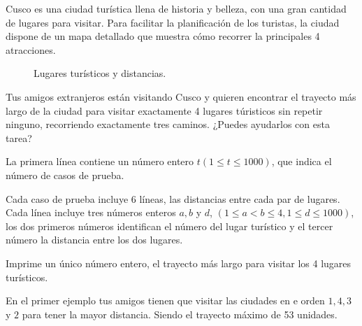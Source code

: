 
Cusco es una ciudad turística llena de historia y belleza, con una gran cantidad de lugares para visitar. Para facilitar la planificación de los turistas, la ciudad dispone de un mapa detallado que muestra cómo recorrer la principales 4 atracciones.

\begin{figure}[h]
    \centering
    
    \captionsetup{labelformat=empty}
    \caption{Lugares turísticos y distancias.}
\end{figure}

Tus amigos extranjeros están visitando Cusco y quieren encontrar el trayecto más largo de la ciudad para visitar exactamente 4 lugares túristicos sin repetir ninguno, recorriendo exactamente tres caminos. ¿Puedes ayudarlos con esta tarea?


La primera línea contiene un número entero $t (1 \leq t \leq 1000)$,  que indica el número de casos de prueba.

Cada caso de prueba incluye 6 líneas, las distancias entre cada par de lugares. Cada línea incluye tres números enteros $a, b$ y $d$, $(1 \leq a < b \leq 4, 1 \leq d \leq 1000)$, los dos primeros números identifican el número del lugar turístico y el tercer número la distancia entre los dos lugares.

\outputText

Imprime un único número entero, el trayecto más largo para visitar los 4 lugares turísticos.

\exampleCases

\begin{example}
\end{example}

\explanationText

En el primer ejemplo tus amigos tienen que visitar las ciudades en e orden $1, 4, 3$ y $2$ para tener la mayor distancia. Siendo el trayecto máximo de 53 unidades.
